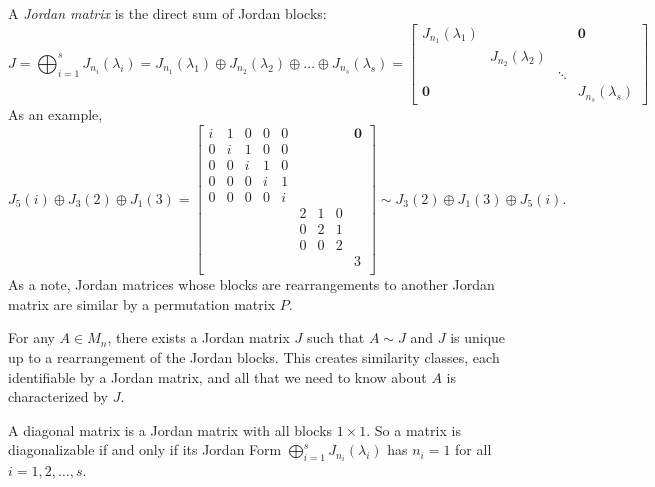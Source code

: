 \begin{definition}
\label{def:jordan-matrix}
A \textit{Jordan matrix} is the direct sum of Jordan blocks:
$$
J 
    = \bigoplus_{i=1}^s J_{n_i}(\lambda_i)
    = J_{n_1}(\lambda_1) \oplus J_{n_2}(\lambda_2) \oplus \dots \oplus J_{n_s}(\lambda_s) 
    = \begin{bmatrix} J_{n_1}(\lambda_1) & & & \mathbf{0} \\ & J_{n_2}(\lambda_2) & & \\ & & \ddots & \\ \mathbf{0} & & & J_{n_s}(\lambda_s)\end{bmatrix}
$$
As an example, $$
J_5(i) \oplus J_3(2) \oplus J_1(3) = \begin{bmatrix} 
        i & 1 & 0 & 0 & 0 & & & & \mathbf{0} \\ 
        0 & i & 1 & 0 & 0 & & & & \\
        0 & 0 & i & 1 & 0 & & & & \\
        0 & 0 & 0 & i & 1 & & & & \\
        0 & 0 & 0 & 0 & i & & & & \\
                & & & & & 2 & 1 & 0 & \\
                & & & & & 0 & 2 & 1 & \\
                & & & & & 0 & 0 & 2 &\\
                    & & & & & & & & 3 \\
        \end{bmatrix}
    \sim J_3(2) \oplus J_1(3) \oplus J_5(i).
$$
As a note, Jordan matrices whose blocks are rearrangements to another Jordan matrix are similar by a permutation matrix $P$.
\end{definition}

\begin{theorem}
\label{thm:jcf}
For any $A \in M_n$, there exists a Jordan matrix $J$ such that $A \sim J$ and $J$ is unique up to a rearrangement of the Jordan blocks. This creates similarity classes, each identifiable by a Jordan matrix, and all that we need to know about $A$ is characterized by $J$.
\end{theorem}

\begin{note*}
A diagonal matrix is a Jordan matrix with all blocks $1 \times 1$. So a matrix is diagonalizable if and only if its Jordan Form $\bigoplus_{i=1}^s J_{n_i}(\lambda_i)$ has $n_i = 1$ for all $i = 1, 2, \dots, s$.
\end{note*}


